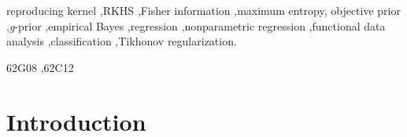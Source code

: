 \documentclass[preprint,12pt,authoryear]{elsarticle}
\begin{document}
\begin{frontmatter}
		
		
		
		\begin{keyword}
			reproducing kernel \sep RKHS \sep Fisher information \sep maximum entropy, objective prior \sep {\em g}-prior \sep empirical Bayes \sep regression \sep nonparametric regression \sep functional data analysis \sep classification \sep Tikhonov regularization.
			
			
			
			 \MSC[2010] 62G08 \sep 62C12
			
		\end{keyword}
		
	\end{frontmatter}
	
	

\section{Introduction}\label{sec-intro}
\end{document}
